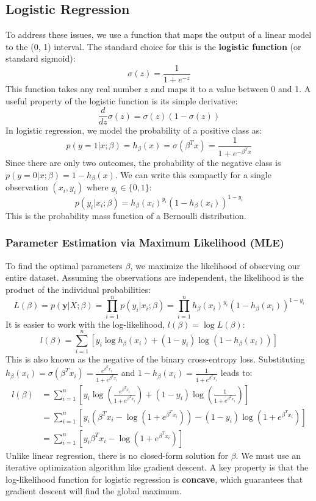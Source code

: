 \documentclass{article}
\begin{document}
\begin{multicols}{2}
\subsection{Logistic Regression}
To address these issues, we use a function that maps the output of a linear model to the (0, 1) interval. The standard choice for this is the \textbf{logistic function} (or standard sigmoid):
$$ \sigma(z) = \frac{1}{1 + e^{-z}} $$
This function takes any real number $z$ and maps it to a value between 0 and 1. A useful property of the logistic function is its simple derivative:
$$ \frac{d}{dz}\sigma(z) = \sigma(z)(1 - \sigma(z)) $$
In logistic regression, we model the probability of a positive class as:
$$ p(y=1|x; \beta) = h_\beta(x) = \sigma(\beta^T x) = \frac{1}{1 + e^{-\beta^T x}} $$
Since there are only two outcomes, the probability of the negative class is $p(y=0|x; \beta) = 1 - h_\beta(x)$. We can write this compactly for a single observation $(x_i, y_i)$ where $y_i \in \{0, 1\}$:
$$ p(y_i|x_i; \beta) = h_\beta(x_i)^{y_i} (1 - h_\beta(x_i))^{1-y_i} $$
This is the probability mass function of a Bernoulli distribution.

\subsubsection{Parameter Estimation via Maximum Likelihood (MLE)}
To find the optimal parameters $\beta$, we maximize the likelihood of observing our entire dataset. Assuming the observations are independent, the likelihood is the product of the individual probabilities:
$$ L(\beta) = p(\mathbf{y}|X; \beta) = \prod_{i=1}^{n} p(y_i|x_i; \beta) = \prod_{i=1}^{n} h_\beta(x_i)^{y_i} (1 - h_\beta(x_i))^{1-y_i} $$
It is easier to work with the log-likelihood, $l(\beta) = \log L(\beta)$:
$$ l(\beta) = \sum_{i=1}^{n} \left[ y_i \log h_\beta(x_i) + (1-y_i) \log(1 - h_\beta(x_i)) \right] $$
This is also known as the negative of the binary cross-entropy loss. Substituting $h_\beta(x_i) = \sigma(\beta^T x_i) = \frac{e^{\beta^T x_i}}{1 + e^{\beta^T x_i}}$ and $1-h_\beta(x_i) = \frac{1}{1 + e^{\beta^T x_i}}$ leads to:
\begin{align*}
l(\beta) &= \sum_{i=1}^{n} \left[ y_i \log\left(\frac{e^{\beta^T x_i}}{1 + e^{\beta^T x_i}}\right) + (1-y_i) \log\left(\frac{1}{1 + e^{\beta^T x_i}}\right) \right] \\
&= \sum_{i=1}^{n} \left[ y_i (\beta^T x_i - \log(1 + e^{\beta^T x_i})) - (1-y_i)\log(1 + e^{\beta^T x_i}) \right] \\
&= \sum_{i=1}^{n} \left[ y_i \beta^T x_i - \log(1 + e^{\beta^T x_i}) \right]
\end{align*}
Unlike linear regression, there is no closed-form solution for $\beta$. We must use an iterative optimization algorithm like gradient descent. A key property is that the log-likelihood function for logistic regression is \textbf{concave}, which guarantees that gradient descent will find the global maximum.


\end{multicols}
\end{document}
